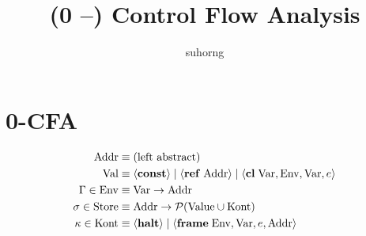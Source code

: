 \documentclass{article}
\begin{document}
\title{(0 --) Control Flow Analysis}
\author{suhorng}
\maketitle
\section{0-CFA}
\[\begin{aligned}
\text{Addr} &\equiv (\text{left abstract})\\
\text{Val} &\equiv \langle\mathbf{const}\rangle \;|\; \langle\mathbf{ref}\; \text{Addr}\rangle \;|\; \langle\mathbf{cl}\; \text{Var}, \text{Env}, \text{Var}, e\rangle\\
\Gamma \in \text{Env} &\equiv \text{Var} \to \text{Addr}\\
\sigma \in \text{Store} &\equiv \text{Addr} \to \mathcal P(\text{Value}\cup\text{Kont}) \\
\kappa \in \text{Kont} &\equiv \langle\mathbf{halt}\rangle \;|\; \langle\mathbf{frame}\; \text{Env}, \text{Var}, e, \text{Addr}\rangle
\end{aligned}\]
\end{document}
